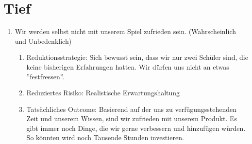 \section{Tief}
\begin{enumerate}
    \item Wir werden selbst nicht mit unserem Spiel zufrieden sein. (Wahrscheinlich und Unbedenklich)
    \begin{enumerate}
        \item Reduktionsstrategie: Sich bewusst sein, dass wir nur zwei Schüler sind, die keine bisherigen Erfahrungen hatten. Wir dürfen uns nicht an etwas ''festfressen''.
        \item Reduziertes Risiko: Realistische Erwartungshaltung
        \item Tatsächliches Outcome: Basierend auf der uns zu verfügungsstehenden Zeit und unserem Wissen, sind wir zufrieden mit unserem Produkt. Es gibt immer noch Dinge, die wir gerne verbessern und hinzufügen würden. So könnten wird noch Tausende Stunden investieren.
    \end{enumerate}
\end{enumerate}